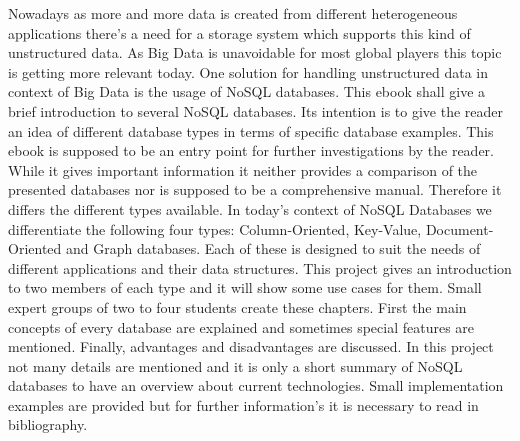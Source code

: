 Nowadays as more and more data is created from different heterogeneous applications there’s a need for a storage system which supports this kind of unstructured data. As Big Data is unavoidable for most global players this topic is getting more relevant today. One solution for handling unstructured data in context of Big Data is the usage of NoSQL databases. This ebook shall give a brief introduction to several NoSQL databases. Its intention is to give the reader an idea of different database types in terms of specific database examples. This ebook is supposed to be an entry point for further investigations by the reader. While it gives important information it neither provides a comparison of the presented databases nor is supposed to be a comprehensive manual. Therefore it differs the different types available.
In today’s context of NoSQL Databases we differentiate the following four types: Column-Oriented, Key-Value, Document-Oriented and Graph databases. Each of these is designed to suit the needs of different applications and their data structures. This project gives an introduction to two members of each type and it will show some use cases for them. Small expert groups of two to four students create these chapters. First the main concepts of every database are explained and sometimes special features are mentioned. Finally, advantages and disadvantages are discussed. In this project not many details are mentioned and it is only a short summary of NoSQL databases to have an overview about current technologies. Small implementation examples are provided but for further information’s it is necessary to read in bibliography.